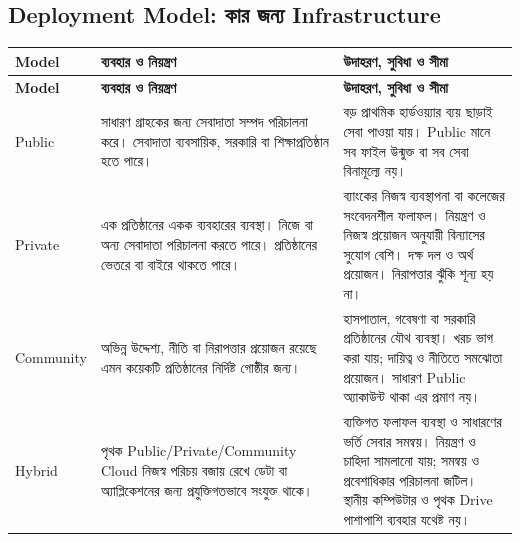 \subsection{Deployment Model: কার জন্য Infrastructure}
\label{ch2:c10-06}
\begin{longtable}{|p{}|p{}|p{}|}\hline
\textbf{Model} & \textbf{ব্যবহার ও নিয়ন্ত্রণ} & \textbf{উদাহরণ, সুবিধা ও সীমা}\\\hline
\endfirsthead\hline\textbf{Model} & \textbf{ব্যবহার ও নিয়ন্ত্রণ} & \textbf{উদাহরণ, সুবিধা ও সীমা}\\\hline\endhead
Public & সাধারণ গ্রাহকের জন্য সেবাদাতা সম্পদ পরিচালনা করে। সেবাদাতা ব্যবসায়িক, সরকারি বা শিক্ষাপ্রতিষ্ঠান হতে পারে। & বড় প্রাথমিক হার্ডওয়্যার ব্যয় ছাড়াই সেবা পাওয়া যায়। Public মানে সব ফাইল উন্মুক্ত বা সব সেবা বিনামূল্যে নয়।\\\hline
Private\label{ch2:c10-07} & এক প্রতিষ্ঠানের একক ব্যবহারের ব্যবস্থা। নিজে বা অন্য সেবাদাতা পরিচালনা করতে পারে। প্রতিষ্ঠানের ভেতরে বা বাইরে থাকতে পারে। & ব্যাংকের নিজস্ব ব্যবস্থাপনা বা কলেজের সংবেদনশীল ফলাফল। নিয়ন্ত্রণ ও নিজস্ব প্রয়োজন অনুযায়ী বিন্যাসের সুযোগ বেশি। দক্ষ দল ও অর্থ প্রয়োজন। নিরাপত্তার ঝুঁকি শূন্য হয় না।\\\hline
Community\label{ch2:c10-08} & অভিন্ন উদ্দেশ্য, নীতি বা নিরাপত্তার প্রয়োজন রয়েছে এমন কয়েকটি প্রতিষ্ঠানের নির্দিষ্ট গোষ্ঠীর জন্য। & হাসপাতাল, গবেষণা বা সরকারি প্রতিষ্ঠানের যৌথ ব্যবস্থা। খরচ ভাগ করা যায়; দায়িত্ব ও নীতিতে সমঝোতা প্রয়োজন। সাধারণ Public অ্যাকাউন্ট থাকা এর প্রমাণ নয়।\\\hline
Hybrid\label{ch2:c10-09} & পৃথক Public/Private/Community Cloud নিজস্ব পরিচয় বজায় রেখে ডেটা বা অ্যাপ্লিকেশনের জন্য প্রযুক্তিগতভাবে সংযুক্ত থাকে। & ব্যক্তিগত ফলাফল ব্যবস্থা ও সাধারণের ভর্তি সেবার সমন্বয়। নিয়ন্ত্রণ ও চাহিদা সামলানো যায়; সমন্বয় ও প্রবেশাধিকার পরিচালনা জটিল। স্থানীয় কম্পিউটার ও পৃথক Drive পাশাপাশি ব্যবহার যথেষ্ট নয়।\\\hline
\end{longtable}
